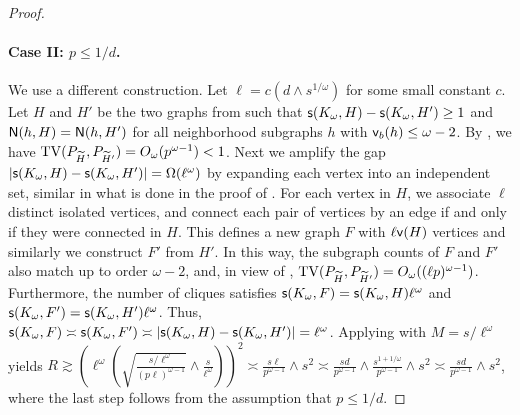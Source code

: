 \begin{proof}
\paragraph{Case II: $ p \leq 1/d $.}
We use a different construction.
Let $\ell= c(d \wedge s^{1/\omega})$ for some small constant $c$. Let $ H $ and $ H' $ be the two graphs from  such that $ \mathsf{s}(K_{\omega}, H)- \mathsf{s}(K_{\omega}, H') \geq 1 $ and  $ {\mathsf{N}}(h, H) = {\mathsf{N}}(h, H') $ for all neighborhood subgraphs $ h $ with $ {\mathsf{v}}_b(h) \leq \omega-2 $.
By , we have $ {\rm TV}(P_{{\widetilde{H}}}, P_{{\widetilde{H}}'}) = O_{\omega}(p^{\omega-1}) < 1 $. 
Next we amplify the gap $ |\mathsf{s}(K_{\omega}, H)- \mathsf{s}(K_{\omega}, H')|= \Omega(\ell^{\omega}) $ by expanding each vertex into an independent set, similar in what is done in the proof of . For each vertex in $H$, we associate $ \ell $ distinct isolated vertices, and connect each pair of vertices by an edge if and only if they were connected in $H$. This defines a new graph $F$ with $\ell {\mathsf{v}}(H)$ vertices and similarly we construct $F'$ from $H'$. In this way, the subgraph counts of $F$ and $F'$ also match up to order $ \omega-2 $, and, in view of , $ {\rm TV}(P_{{\widetilde{H}}}, P_{{\widetilde{H}}'}) = O_{\omega}((\ell p)^{\omega-1}) $.
Furthermore, the number of cliques satisfies $\mathsf{s}(K_\omega,F)=\mathsf{s}(K_\omega,H) \ell^\omega$ and $\mathsf{s}(K_\omega,F')=\mathsf{s}(K_\omega,H') \ell^\omega$.
Thus, $ \mathsf{s}(K_{\omega}, F) \asymp \mathsf{s}(K_{\omega}, F') \asymp |\mathsf{s}(K_{\omega}, H) - \mathsf{s}(K_{\omega}, H')| = \ell^{\omega} $.
Applying  with $M=s/\ell^{\omega}$ yields  $R  \gtrsim (\ell^{\omega} (\sqrt{\frac{s/\ell^{\omega}}{(p\ell)^{\omega-1}}} \wedge \frac{s}{\ell^{\omega}}))^2  \asymp \frac{s\ell}{p^{\omega-1}} \wedge s^2 \asymp \frac{s d }{p^{\omega-1}} \wedge \frac{s^{1+1/\omega}}{p^{\omega-1}} \wedge s^2 \asymp \frac{s d }{p^{\omega-1}}  \wedge s^2$, where the last step follows from the assumption that $ p \leq 1/d $.
\end{proof}

%

